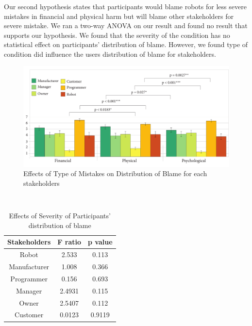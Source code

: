 \documentclass{sigchi}
\begin{document}
Our second hypothesis states that participants would blame robots for less severe mistakes in financial and physical harm but will blame other stakeholders for severe mistake. We ran a two-way ANOVA on our result and found no result that supports our hypothesis. We found that the severity of the condition has no statistical effect on participants' distribution of blame. However, we found type of condition did influence the users distribution of blame for stakeholders. 



\begin{figure}[!tp]
\centering
\includegraphics[width=7.1in]{typeGraph}
\caption{Effects of Type of Mistakes on Distribution of Blame for each stakeholders}
\label{fig:figure5}
\vspace{-6pt}
\end{figure}


\hspace{1 mm} \\
\begin{table}[h]
  \centering
  \begin{tabular}{ccc}
    Stakeholders & F ratio & p value\\
    \hline
    Robot & 2.533 & 0.113\\
    Manufacturer & 1.008 & 0.366\\
    Programmer & 0.156 & 0.693 \\
    Manager & 2.4931 & 0.115 \\
    Owner & 2.5407 & 0.112 \\
    Customer & 0.0123 & 0.9119 \\
    \hline
  \end{tabular}
  \caption{Effects of Severity of Participants' distribution of blame}
  \label{tab:table2}
\end{table}
\end{document}
